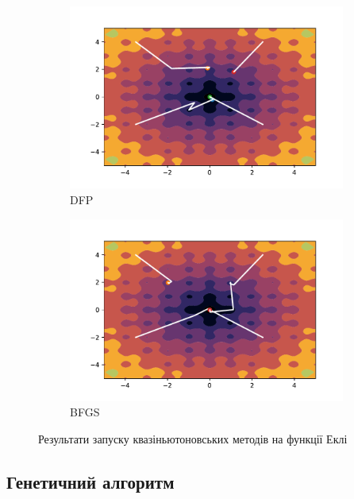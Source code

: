 \begin{figure}
    \ContinuedFloat
    \begin{subfigure}{0.5\textwidth}
        \includegraphics[width=\textwidth, trim=1cm 0.5cm 1.3cm 1cm, clip]{assets/DFP/ackley.pdf}
        \caption{DFP}
    \end{subfigure}
    \begin{subfigure}{0.5\textwidth}
        \includegraphics[width=\textwidth, trim=1cm 0.5cm 1.3cm 1cm, clip]{assets/BFGS/ackley.pdf}
        \caption{BFGS}
    \end{subfigure}
    \caption{Результати запуску квазіньютоновських методів на функції Еклі}
\end{figure}

\vspace*{10cm}
\subsection*{Генетичний алгоритм}

